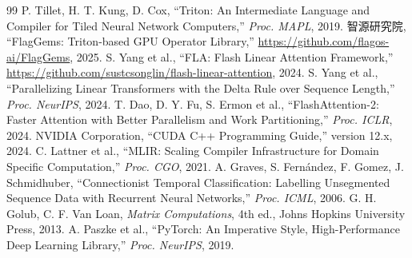 \begin{thebibliography}{99}
\small
{} P. Tillet, H. T. Kung, D. Cox, ``Triton: An Intermediate Language and Compiler for Tiled Neural Network Computers,'' \textit{Proc. MAPL}, 2019.
 智源研究院, ``FlagGems: Triton-based GPU Operator Library,'' \url{https://github.com/flagos-ai/FlagGems}, 2025.
 S. Yang et al., ``FLA: Flash Linear Attention Framework,'' \url{https://github.com/sustcsonglin/flash-linear-attention}, 2024.
 S. Yang et al., ``Parallelizing Linear Transformers with the Delta Rule over Sequence Length,'' \textit{Proc. NeurIPS}, 2024.
 T. Dao, D. Y. Fu, S. Ermon et al., ``FlashAttention-2: Faster Attention with Better Parallelism and Work Partitioning,'' \textit{Proc. ICLR}, 2024.
 NVIDIA Corporation, ``CUDA C++ Programming Guide,'' version 12.x, 2024.
 C. Lattner et al., ``MLIR: Scaling Compiler Infrastructure for Domain Specific Computation,'' \textit{Proc. CGO}, 2021.
 A. Graves, S. Fernández, F. Gomez, J. Schmidhuber, ``Connectionist Temporal Classification: Labelling Unsegmented Sequence Data with Recurrent Neural Networks,'' \textit{Proc. ICML}, 2006.
 G. H. Golub, C. F. Van Loan, \textit{Matrix Computations}, 4th ed., Johns Hopkins University Press, 2013.
 A. Paszke et al., ``PyTorch: An Imperative Style, High-Performance Deep Learning Library,'' \textit{Proc. NeurIPS}, 2019.
\end{thebibliography}

